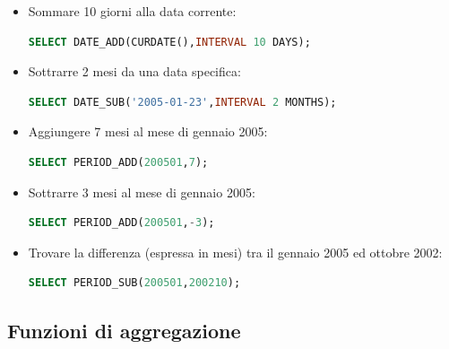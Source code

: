 \begin{itemize}

\item Sommare 10 giorni alla data corrente:

\begin{lstlisting}[language=SQL]
SELECT DATE_ADD(CURDATE(),INTERVAL 10 DAYS);
\end{lstlisting}

\item Sottrarre 2 mesi da una data specifica:

\begin{lstlisting}[language=SQL]
SELECT DATE_SUB('2005-01-23',INTERVAL 2 MONTHS);
\end{lstlisting}
\item Aggiungere 7 mesi al mese di gennaio 2005:

\begin{lstlisting}[language=SQL]
SELECT PERIOD_ADD(200501,7);
\end{lstlisting}
\item Sottrarre 3 mesi al mese di gennaio 2005:
\begin{lstlisting}[language=SQL]
SELECT PERIOD_ADD(200501,-3);
\end{lstlisting}
\item Trovare la differenza (espressa in mesi) tra il gennaio 2005 ed ottobre 2002:
\begin{lstlisting}[language=SQL]
SELECT PERIOD_SUB(200501,200210);
\end{lstlisting}
\end{itemize}


\subsection{Funzioni di aggregazione}

